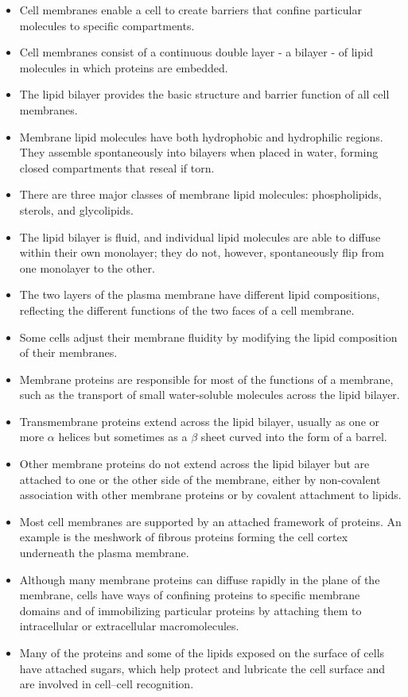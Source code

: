 \begin{itemize}
\item Cell membranes enable a cell to create barriers that confine particular
molecules to specific compartments.
\item Cell membranes consist of a continuous double layer - a bilayer - of
lipid molecules in which proteins are embedded.
\item The lipid bilayer provides the basic structure and barrier function of
all cell membranes.
\item Membrane lipid molecules have both hydrophobic and hydrophilic
regions. They assemble spontaneously into bilayers when placed in
water, forming closed compartments that reseal if torn.
\item There are three major classes of membrane lipid molecules: phospholipids,
sterols, and glycolipids.
\item The lipid bilayer is fluid, and individual lipid molecules are able to
diffuse within their own monolayer; they do not, however, spontaneously
flip from one monolayer to the other.
\item The two layers of the plasma membrane have different lipid compositions,
reflecting the different functions of the two faces of a cell
membrane.
\item Some cells adjust their membrane fluidity by modifying the lipid composition
of their membranes.
\item Membrane proteins are responsible for most of the functions of a
membrane, such as the transport of small water-soluble molecules
across the lipid bilayer.
\item Transmembrane proteins extend across the lipid bilayer, usually as
one or more $\alpha$ helices but sometimes as a $\beta$ sheet curved into the
form of a barrel.
\item Other membrane proteins do not extend across the lipid bilayer but
are attached to one or the other side of the membrane, either by non-covalent
association with other membrane proteins or by covalent
attachment to lipids.
\item Most cell membranes are supported by an attached framework of
proteins. An example is the meshwork of fibrous proteins forming the
cell cortex underneath the plasma membrane.
\item Although many membrane proteins can diffuse rapidly in the plane of
the membrane, cells have ways of confining proteins to specific membrane
domains and of immobilizing particular proteins by attaching
them to intracellular or extracellular macromolecules.
\item Many of the proteins and some of the lipids exposed on the surface of
cells have attached sugars, which help protect and lubricate the cell
surface and are involved in cell–cell recognition.
\end{itemize}

